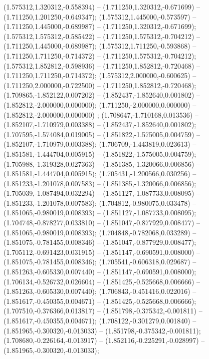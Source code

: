  (1.575312,1.320312,-0.558394) -- (1.711250,1.320312,-0.671699) -- (1.711250,1.201250,-0.649347);
 (1.575312,1.445000,-0.573597) -- (1.711250,1.445000,-0.689987) -- (1.711250,1.320312,-0.671699);
 (1.575312,1.575312,-0.585422) -- (1.711250,1.575312,-0.704212) -- (1.711250,1.445000,-0.689987);
 (1.575312,1.711250,-0.593868) -- (1.711250,1.711250,-0.714372) -- (1.711250,1.575312,-0.704212);
 (1.575312,1.852812,-0.598936) -- (1.711250,1.852812,-0.720468) -- (1.711250,1.711250,-0.714372);
 (1.575312,2.000000,-0.600625) -- (1.711250,2.000000,-0.722500) -- (1.711250,1.852812,-0.720468);
 (1.709865,-1.852122,0.007202) -- (1.852437,-1.852640,0.001802) -- (1.852812,-2.000000,0.000000);
 (1.711250,-2.000000,0.000000) -- (1.852812,-2.000000,0.000000) ;
 (1.708647,-1.710168,0.013536) -- (1.852107,-1.710979,0.003388) -- (1.852437,-1.852640,0.001802);
 (1.707595,-1.574084,0.019005) -- (1.851822,-1.575005,0.004759) -- (1.852107,-1.710979,0.003388);
 (1.706709,-1.443819,0.023613) -- (1.851581,-1.444704,0.005915) -- (1.851822,-1.575005,0.004759);
 (1.705988,-1.319328,0.027363) -- (1.851385,-1.320066,0.006856) -- (1.851581,-1.444704,0.005915);
 (1.705431,-1.200566,0.030256) -- (1.851233,-1.201078,0.007583) -- (1.851385,-1.320066,0.006856);
 (1.705039,-1.087494,0.032294) -- (1.851127,-1.087733,0.008095) -- (1.851233,-1.201078,0.007583);
 (1.704812,-0.980075,0.033478) -- (1.851065,-0.980019,0.008393) -- (1.851127,-1.087733,0.008095);
 (1.704748,-0.878277,0.033810) -- (1.851047,-0.877929,0.008477) -- (1.851065,-0.980019,0.008393);
 (1.704848,-0.782068,0.033289) -- (1.851075,-0.781455,0.008346) -- (1.851047,-0.877929,0.008477);
 (1.705112,-0.691423,0.031915) -- (1.851147,-0.690591,0.008000) -- (1.851075,-0.781455,0.008346);
 (1.705541,-0.606318,0.029687) -- (1.851263,-0.605330,0.007440) -- (1.851147,-0.690591,0.008000);
 (1.706134,-0.526732,0.026604) -- (1.851425,-0.525668,0.006666) -- (1.851263,-0.605330,0.007440);
 (1.706843,-0.451416,0.022016) -- (1.851617,-0.450355,0.004671) -- (1.851425,-0.525668,0.006666);
 (1.707510,-0.376366,0.013817) -- (1.851798,-0.375342,-0.001811) -- (1.851617,-0.450355,0.004671);
 (1.708122,-0.301279,0.001840) -- (1.851965,-0.300320,-0.013033) -- (1.851798,-0.375342,-0.001811);
 (1.708680,-0.226164,-0.013917) -- (1.852116,-0.225291,-0.028997) -- (1.851965,-0.300320,-0.013033);
